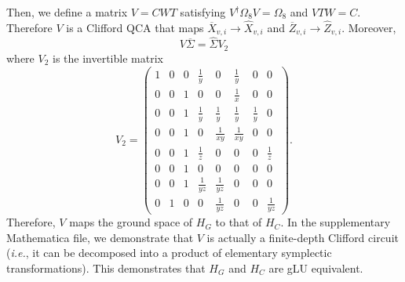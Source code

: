\documentclass[prx,twocolumn,superscriptaddress,nofootinbib,showpacs,notitlepage]{revtex4-2}
\begin{document}
Then, we define a matrix $V=CWT$ satisfying $V^\dagger\Omega_8 V=\Omega_8$ and $VTW=C$. Therefore $V$ is a Clifford QCA that maps $\overline{X}_{v,i}\to\widehat{X}_{v,i}$ and $\overline{Z}_{v,i}\to\widehat{Z}_{v,i}$. Moreover,
\begin{equation}
    V\overline{\Sigma}=\widehat{\Sigma}V_2
\end{equation}
where $V_2$ is the invertible matrix
\begin{equation}
    V_2=\begin{pmatrix}
    1 & 0 & 0 & \frac{1}{y} & 0 & \frac{1}{y} & 0 & 0 \\
    0 & 0 & 1 & 0 & 0 & \frac{1}{x} & 0 & 0 \\
    0 & 0 & 1 & \frac{1}{y} & \frac{1}{y} & \frac{1}{y} & \frac{1}{y} & 0 \\
    0 & 0 & 1 & 0 & \frac{1}{xy} & \frac{1}{xy} & 0 & 0 \\
    0 & 0 & 1 & \frac{1}{z} & 0 & 0 & 0 & \frac{1}{z} \\
    0 & 0 & 1 & 0 & 0 & 0 & 0 & 0 \\
    0 & 0 & 1 & \frac{1}{yz} & \frac{1}{yz} & 0 & 0 & 0 \\
    0 & 1 & 0 & 0 & \frac{1}{yz} & 0 & 0 & \frac{1}{yz} 
\end{pmatrix}.
\end{equation}
Therefore, $V$ maps the ground space of $H_G$ to that of $H_C$. In the supplementary Mathematica file, we demonstrate that $V$ is actually a finite-depth Clifford circuit (\textit{i.e.}, it can be decomposed into a product of elementary symplectic transformations). This demonstrates that $H_G$ and $H_C$ are gLU equivalent.
\end{document}
